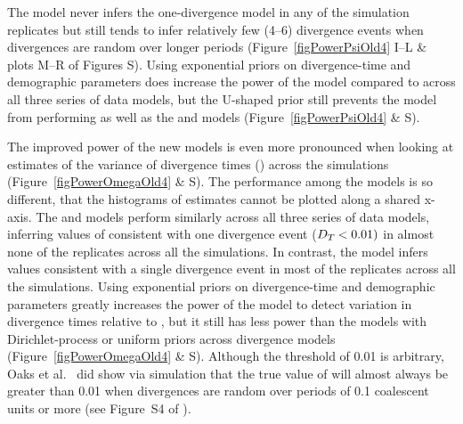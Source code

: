 The \modelUniform model never infers the one-divergence model in any of the
simulation replicates but still tends to infer relatively few (4--6) divergence
events when divergences are random over longer periods 
(Figure~\ref{figPowerPsiOld4} I--L \& plots M--R of Figures
S).
Using exponential priors on divergence-time and demographic parameters does
increase the power of the \modelUshaped model compared to \modelOld across all
three series of data models, but the U-shaped prior still prevents the model
from performing as well as the \modelDPP and \modelUniform models 
(Figure~\ref{figPowerPsiOld4} \& 
S).

The improved power of the new models is even more pronounced when looking at
estimates of the variance of divergence times (\divTimeDispersion) across the
simulations
(Figure~\ref{figPowerOmegaOld4} \& 
S).
The performance among the models is so different, that the histograms of
\divTimeDispersion estimates cannot be plotted along a shared x-axis.
The \modelDPP and \modelUniform models perform similarly across all three
series of data models, inferring values of \divTimeDispersion consistent with
one divergence event ($D_{T_{}} < 0.01)$ in almost none of the
replicates across all the simulations.
In contrast, the \modelOld model infers values consistent with a single
divergence event in most of the replicates across all the simulations.
Using exponential priors on divergence-time and demographic parameters greatly
increases the power of the \modelUshaped model to detect variation in
divergence times relative to \modelOld, but it still has less power than the
models with Dirichlet-process or uniform priors across divergence models 
(Figure~\ref{figPowerOmegaOld4} \& 
S).
Although the \divTimeDispersion threshold of 0.01 is arbitrary, Oaks et al.\
\cite{Oaks2012} did show via simulation that the true value of
\divTimeDispersion will almost always be greater than 0.01 when divergences are
random over periods of 0.1 coalescent units or more (see Figure~S4 of
\cite{Oaks2012}).

